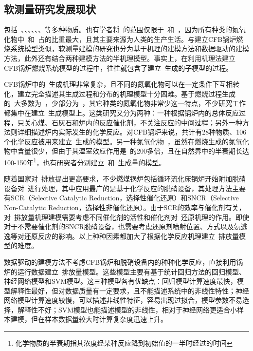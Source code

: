 \subsection{软测量研究发展现状}
包括~、、、、、、等多种物质。也有学者将~的范围仅限于~和~，因为所有种类的氮氧化物中~和~占的比重最大，且其主要来源为人类的生产生活\cite{Agency1999Nitrogen}。与建立CFB锅炉燃烧系统模型类似，软测量建模的研究也分为基于机理的建模方法和数据驱动的建模方法，此外还有结合两种建模方法的半机理模型。事实上，在利用机理法建立CFB锅炉燃烧系统模型的过程中，往往就包含了建立~生成的子模型的过程。

CFB锅炉中的~生成机理非常复杂，且不同的氮氧化物可以在一定条件下互相转化，建立完全描述其生成过程和分布的机理模型十分困难。基于燃烧过程生成的~大多数为~，少部分为~，其它种类的氮氧化物非常少这一特点，不少研究工作都集中在建立~生成模型上。这类研究又分为两种：一种根据锅炉内的总体反应过程，只关心煤、石灰石和炉内的反应催化剂，不关注反应的中间过程；另外一种方法则详细描述炉内实际发生的化学反应\cite{johnsson1990modelling}。对CFB锅炉来说，共计有28种物质、106个化学反应被用来建立~生成的模型\cite{talukdar1995simplified}。另一种氮氧化物~，虽然在燃烧生成的氮氧化物中含量很少，但由于其温室效应作用是~的200多倍，且在自然界中的半衰期长达100-150年\footnote{化学物质的半衰期指其浓度经某种反应降到初始值的一半时经过的时间}，也有研究者分别建立~和~生成量的模型\cite{liukkonen2012dynamic}。

随着国家对~排放提出更高要求，不少燃煤锅炉包括循环流化床锅炉开始附加脱硝设备对~进行处理，其中应用最广的是基于化学反应的脱硝设备，其处理方法主要有SCR（Selective Catalytic Reduction，选择性催化还原）和SNCR（Selective Non-Catalytic Reduction，选择性非催化还原）。由于SCR的效率与催化剂有关，对~排放量机理建模需要考虑不同催化剂的活性和催化剂对~还原机理的作用。即使对于不需要催化剂的SNCR脱硝设备，也需要考虑还原剂喷射位置、方式以及氨逃逸等对还原反应的影响\cite{李穹2013sncr}。以上种种因素都加大了根据化学反应机理建立~排放量模型的难度。

数据驱动的建模方法不考虑CFB锅炉和脱硝设备内的种种化学反应，直接利用锅炉的运行数据建立~排放量模型。这些模型主要有基于统计回归方法的回归模型、神经网络模型和SVM模型。这三种模型各有优缺点：回归模型计算速度最快，模型解释性最好，但对数据质量有一定要求，且不能描述系统中的非线性特性；神经网络模型计算速度较慢，可以描述非线性特征，容易出现过拟合，模型参数不易选择，解释性不好；SVM模型也能描述模型的非线性，相对于神经网络更适合小样本建模，但在样本数据量较大时计算复杂度迅速上升。

